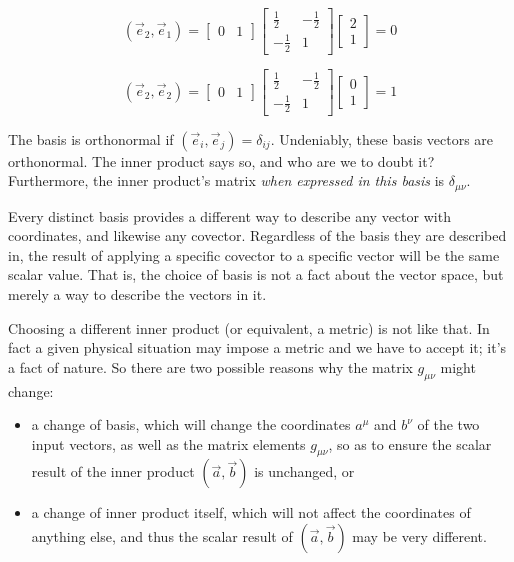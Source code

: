 $$
(\vec{e}_2, \vec{e}_1) =
\begin{bmatrix}
0 & 1
\end{bmatrix}
\begin{bmatrix}
\frac{1}{2} & -\frac{1}{2} \\
-\frac{1}{2} & 1
\end{bmatrix}
\begin{bmatrix}
2 \\ 1
\end{bmatrix}
= 0
$$    

$$
(\vec{e}_2, \vec{e}_2) =
\begin{bmatrix}
0 & 1
\end{bmatrix}
\begin{bmatrix}
\frac{1}{2} & -\frac{1}{2} \\
-\frac{1}{2} & 1
\end{bmatrix}
\begin{bmatrix}
0 \\ 1
\end{bmatrix}
= 1
$$    

The basis is orthonormal if $(\vec{e}_i, \vec{e}_j) = \delta_{ij}$. Undeniably, these basis vectors are orthonormal. The inner product says so, and who are we to doubt it? Furthermore, the inner product's matrix \textit{when expressed in this basis} is $\delta_{\mu\nu}$.

Every distinct basis provides a different way to describe any vector with coordinates, and likewise any covector. Regardless of the basis they are described in, the result of applying a specific covector to a specific vector will be the same scalar value. That is, the choice of basis is not a fact about the vector space, but merely a way to describe the vectors in it.

Choosing a different inner product (or equivalent, a metric) is not like that. In fact a given physical situation may impose a metric and we have to accept it; it's a fact of nature. So there are two possible reasons why the matrix $g_{\mu\nu}$ might change:

\begin{itemize}
    \item a change of basis, which will change the coordinates $a^{\mu}$ and $b^{\nu}$ of the two input vectors, as well as the matrix elements $g_{\mu\nu}$, so as to ensure the scalar result of the inner product $(\vec{a}, \vec{b})$ is unchanged, or
    \item a change of inner product itself, which will not affect the coordinates of anything else, and thus the scalar result of $(\vec{a}, \vec{b})$ may be very different.
\end{itemize}

